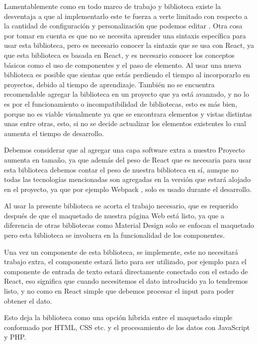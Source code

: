 Lamentablemente como en todo marco de trabajo y biblioteca existe la desventaja a que al implementarlo este te fuerza a verte limitado con respecto a la cantidad de configuración y personalización que podemos editar \cite{newTech}. Otra cosa por tomar en cuenta es que no se necesita aprender una sintaxis específica para usar esta biblioteca, pero es necesario conocer la sintaxis que se usa con React, ya que esta biblioteca es basada en React, y es necesario conocer los conceptos básicos como el uso de componentes y el paso de elemento. Al usar una nueva biblioteca es posible que sientas que estás perdiendo el tiempo al incorporarlo en proyectos, debido al tiempo de aprendizaje. También no se encuentra recomendable agregar la biblioteca en un proyecto que ya está avanzado, y no lo es por el funcionamiento o incompatibilidad de bibliotecas, esto es más bien, porque no es viable visualmente ya que se encontrara elementos y vistas distintas unas entre otras, esto, si no se decide actualizar los elementos existentes lo cual aumenta el tiempo de desarrollo.


Debemos considerar que al agregar una capa software extra a nuestro Proyecto aumenta en tamaño, ya que además del peso de React que es necesaria para usar esta biblioteca debemos contar el peso de nuestra biblioteca en sí, aunque no todas  las tecnologías  mencionadas son agregadas en la versión que estará alojado en el proyecto, ya que por ejemplo Webpack \cite{webPack}, solo es usado durante el desarrollo.

Al usar la presente biblioteca se acorta el trabajo necesario, que es requerido después de que el maquetado de nuestra página Web está listo, ya que a diferencia de otras bibliotecas  como Material Design solo se enfocan el maquetado pero esta biblioteca se involucra en la funcionalidad de los componentes.

Una vez un componente de esta biblioteca, se implemente,  este no necesitará trabajo extra, el componente estará listo para ser utilizado, por ejemplo para el componente de entrada de texto estará directamente conectado con el estado de React, eso significa que cuando necesitemos el dato introducido ya lo tendremos listo, y no como en React simple que debemos procesar el input para poder obtener el dato.

Esto deja la biblioteca como una opción híbrida entre el maquetado simple conformado por HTML, CSS etc. y el procesamiento de los datos con JavaScript y PHP.

\newpage